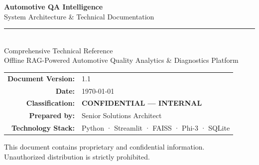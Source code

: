 \documentclass[12pt, a4paper, twoside]{article}
\begin{document}
\thispagestyle{empty}

\vspace*{1.5cm}

\begin{center}
  {\color{white}\Huge\bfseries Automotive QA Intelligence}\\[0.4cm]
  {\color{slate300}\Large System Architecture \& Technical Documentation}
\end{center}

\vspace{3cm}

\begin{center}
  {\color{skyblue}\rule{6cm}{1.5pt}}\\[1cm]
  {\color{slate600}\large Comprehensive Technical Reference}\\[0.3cm]
  {\color{slate500}\normalsize Offline RAG-Powered Automotive Quality Analytics \& Diagnostics Platform}\\[2cm]

  \begin{tabular}{rl}
    \color{slate500}\textbf{Document Version:} & \color{slate700} 1.1 \\[4pt]
    \color{slate500}\textbf{Date:} & \color{slate700} \today \\[4pt]
    \color{slate500}\textbf{Classification:} & \color{rose}\textbf{CONFIDENTIAL — INTERNAL} \\[4pt]
    \color{slate500}\textbf{Prepared by:} & \color{slate700} Senior Solutions Architect \\[4pt]
    \color{slate500}\textbf{Technology Stack:} & \color{slate700} Python · Streamlit · FAISS · Phi-3 · SQLite \\
  \end{tabular}
\end{center}

\vfill
\begin{center}
  {\color{slate400}\footnotesize This document contains proprietary and confidential information.\\
  Unauthorized distribution is strictly prohibited.}
\end{center}
\end{document}
